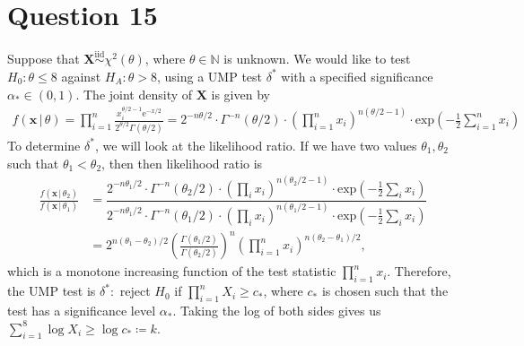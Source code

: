 \documentclass[10pt]{article}
\begin{document}
\section{Question 15} \noindent
Suppose that \(\bm{X} \overset{\mathrm{iid}}{\sim} \chi^2(\theta)\), where \(\theta \in \mathbb{N}\) is unknown. We would like to test 
\(H_0 : \theta \le 8\) against \(H_A : \theta > 8\), using a UMP test \(\delta^*\) with a specified significance \(\alpha_* \in (0,1)\). 
The joint density of \(\bm{X}\) is given by 
\begin{align*}
    f(\mathbf{x} \,|\, \theta)
    = \prod_{i=1}^n \frac{x_i^{\theta / 2 - 1} \mathrm{e}^{-x/2}}{2^{\theta/2} \Gamma(\theta/2)}
    = 2^{-n\theta/2} \cdot \Gamma^{-n}(\theta/2) \cdot \left( \prod_{i=1}^n x_i \right)^{n(\theta/2 - 1)} \cdot \mathrm{exp}\left( -\frac{1}{2} \sum_{i=1}^n x_i \right)
\end{align*}
To determine \(\delta^*\), we will look at the likelihood ratio. If we have two values \(\theta_1,\theta_2\) such that \(\theta_1 < \theta_2\), then then 
likelihood ratio is 
\begin{align*}
    \frac{f(\mathbf{x} \,|\, \theta_2)}{f(\mathbf{x} \,|\, \theta_1)}
    &= \dfrac{
        2^{-n\theta_1/2} \cdot \Gamma^{-n}(\theta_2/2) \cdot \left( \prod_i x_i \right)^{n(\theta_2/2 - 1)} \cdot \mathrm{exp}\left( -\frac{1}{2} \sum_i x_i \right)
    }{
        2^{-n\theta_1/2} \cdot \Gamma^{-n}(\theta_1/2) \cdot \left( \prod_i x_i \right)^{n(\theta_1/2 - 1)} \cdot \mathrm{exp}\left( -\frac{1}{2} \sum_i x_i \right)
    } \\
    &= 2^{n(\theta_1 - \theta_2)/2} \left( \frac{\Gamma(\theta_1/2)}{\Gamma(\theta_2/2)} \right)^n \left( \prod_{i=1}^n x_i \right)^{n(\theta_2 - \theta_1)/2},
\end{align*}
which is a monotone increasing function of the test statistic \(\prod_{i=1}^n x_i\). Therefore, the UMP test is \(\delta^* :\) reject \(H_0\) if 
\(\prod_{i=1}^n X_i \ge c_*\), where \(c_*\) is chosen such that the test has a significance level \(\alpha_*\). Taking the log of both sides gives us 
\(\sum_{i=1}^8 \log X_i \ge \log c_* \coloneqq k\). 
\end{document}
